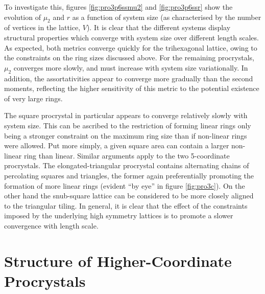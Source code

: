 To investigate this, figures \ref{fig:pro3p6ssmu2} and \ref{fig:pro3p6ssr} show the evolution of $\mu_2$ and $r$ as a function of system size (as characterised
by the number of vertices in the lattice, $V$). 
It is clear that the different systems display structural properties
which converge with system size over different length scales. 
As expected, both metrics converge quickly for the trihexagonal lattice, owing to the constraints on the ring sizes discussed above.
For the remaining procrystals, $\mu_2$ converges more slowly, and must increase with system size variationally.
In addition, the assortativities appear to converge more gradually than the second moments, reflecting the higher sensitivity of this metric to the potential existence of very large rings.

The square procrystal in particular appears to converge relatively slowly with system size. 
This can be ascribed to the restriction of forming linear rings only being a stronger constraint on the maximum ring size than if non\--linear rings
were allowed. 
Put more simply, a given square area can contain a larger non\--linear ring than linear. 
Similar arguments apply to the two 5\--coordinate procrystals.
The elongated\--triangular procrystal contains alternating chains of percolating squares and triangles, the former again preferentially promoting the formation of more linear rings (evident ``by eye'' in figure \ref{fig:pro3c}).
On the other hand the snub\--square lattice can be considered to be more closely aligned to the triangular tiling.
In general, it is clear that the effect of the constraints imposed by the underlying high symmetry lattices is to promote a slower convergence with length scale.


\section{Structure of Higher\--Coordinate Procrystals}
\label{s:pro45}

